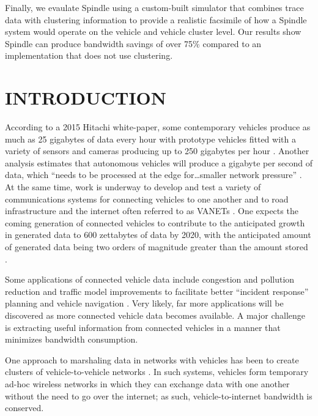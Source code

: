 \documentclass{thesis}
\begin{document}
    Finally, we evaulate Spindle using a custom-built simulator that combines trace data
    with clustering information to provide a realistic facsimile of how a Spindle system
    would operate on the vehicle and vehicle cluster level. Our results show Spindle can
    produce bandwidth savings of over 75\% compared to an implementation that does not
    use clustering. %

\chapter{INTRODUCTION}
    According to a 2015 Hitachi white-paper, some contemporary vehicles produce as much
    as 25 gigabytes of data every hour with prototype vehicles fitted with a variety of sensors
    and cameras producing up to 250 gigabytes per hour \cite{hitachi}. Another analysis estimates
    that autonomous vehicles will produce a gigabyte per second of data, which ``needs to be
    processed at the edge for\dots smaller network pressure'' \cite{edgecomputing}.
    At the same time, work is underway
    to develop and test a variety of communications systems for connecting vehicles to one another
    and to road infrastructure and the internet often referred to as VANETs \cite{connectivitypaper}.  
    One expects the coming generation
    of connected vehicles to contribute to the anticipated growth in generated data to 600 zettabytes
    of data by 2020, with the anticipated amount of generated data being two orders of magnitude
    greater than the amount stored \cite{cisco:cloudindex}.

    Some applications of connected vehicle data include congestion and pollution reduction \cite{cv:trafficmonitoring}
    and traffic model improvements to facilitate better ``incident response'' planning and
    vehicle navigation \cite{hive}. Very likely, far more applications will be discovered
    as more connected vehicle data becomes available. A major challenge is extracting useful
    information from connected vehicles in a manner that minimizes bandwidth consumption.

    One approach to marshaling data in networks with vehicles has been to create clusters of
    vehicle-to-vehicle networks \cite{sbca}\cite{cdrive}\cite{clusterselection}\cite{clustering:mobaware}.
    In such systems, vehicles form temporary ad-hoc wireless networks in which they can exchange
    data with one another without the need to go over the internet; as such, vehicle-to-internet
    bandwidth is conserved.
    
\end{document}
